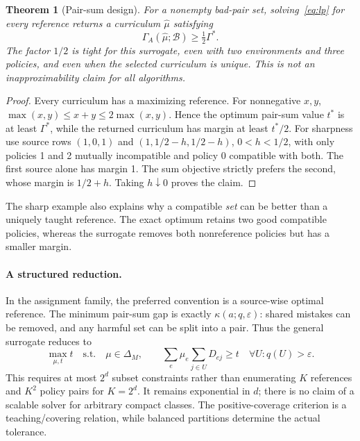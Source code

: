 \documentclass[11pt]{article}
\newtheorem{theorem}{Theorem}
\theoremstyle{definition}\newtheorem{definition}[theorem]{Definition}
\newcommand{\1}{\mathbf{1}}
\newcommand{\simplex}{\Delta_M}
\newcommand{\bad}{\mathcal B}
\newcommand{\Gam}{\Gamma}
\newcommand{\eps}{\varepsilon}
\begin{document}
\begin{theorem}[Pair-sum design]\label{thm:lp}
For a nonempty bad-pair set, solving~\eqref{eq:lp} for every reference returns a curriculum $\widehat\mu$ satisfying
\begin{equation}
 \Gam_A(\widehat\mu;\bad)\geq\tfrac12\Gam^*.
\end{equation}
The factor $1/2$ is tight for this surrogate, even with two environments and three policies, and even when the selected curriculum is unique. This is not an inapproximability claim for all algorithms.
\end{theorem}
\begin{proof}
Every curriculum has a maximizing reference. For nonnegative $x,y$, $\max(x,y)\leq x+y\leq2\max(x,y)$. Hence the optimum pair-sum value $t^*$ is at least $\Gam^*$, while the returned curriculum has margin at least $t^*/2$. For sharpness use source rows $(1,0,1)$ and $(1,1/2-h,1/2-h)$, $0<h<1/2$, with only policies 1 and 2 mutually incompatible and policy 0 compatible with both. The first source alone has margin 1. The sum objective strictly prefers the second, whose margin is $1/2+h$. Taking $h\downarrow0$ proves the claim.
\end{proof}
The sharp example also explains why a compatible \emph{set} can be better than a uniquely taught reference. The exact optimum retains two good compatible policies, whereas the surrogate removes both nonreference policies but has a smaller margin.

\paragraph{A structured reduction.}
In the assignment family, the preferred convention is a source-wise optimal reference. The minimum pair-sum gap is exactly $\kappa(a;q,\eps)$: shared mistakes can be removed, and any harmful set can be split into a pair. Thus the general surrogate reduces to
\begin{equation}
 \max_{\mu,t}t\quad\text{s.t.}\quad
 \mu\in\simplex,\qquad
 \sum_e\mu_e\sum_{j\in U}D_{ej}\geq t
 \quad\forall U:q(U)>\eps.
 \label{eq:coverage-lp}
\end{equation}
This requires at most $2^d$ subset constraints rather than enumerating $K$ references and $K^2$ policy pairs for $K=2^d$. It remains exponential in $d$; there is no claim of a scalable solver for arbitrary compact classes. The positive-coverage criterion is a teaching/covering relation, while balanced partitions determine the actual tolerance.
\end{document}
